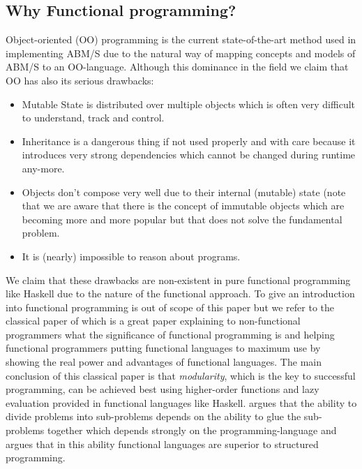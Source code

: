 \subsection{Why Functional programming?}
Object-oriented (OO) programming is the current state-of-the-art method used in implementing ABM/S due to the natural way of mapping concepts and models of ABM/S to an OO-language. Although this dominance in the field we claim that OO has also its serious drawbacks:

\begin{itemize}
\item Mutable State is distributed over multiple objects which is often very difficult to understand, track and control.
\item Inheritance is a dangerous thing if not used properly and with care because it introduces very strong dependencies which cannot be changed during runtime any-more.
\item Objects don't compose very well due to their internal (mutable) state (note that we are aware that there is the concept of immutable objects which are becoming more and more popular but that does not solve the fundamental problem.
\item It is (nearly) impossible to reason about programs.
\end{itemize}

We claim that these drawbacks are non-existent in pure functional programming like Haskell due to the nature of the functional approach. To give an introduction into functional programming is out of scope of this paper but we refer to the classical paper of \cite{hughes_why_1989} which is a great paper explaining to non-functional programmers what the significance of functional programming is and helping functional programmers putting functional languages to maximum use by showing the real power and advantages of functional languages. The main conclusion of this classical paper is that \textit{modularity}, which is the key to successful programming, can be achieved best using higher-order functions and lazy evaluation provided in functional languages like Haskell. \cite{hughes_why_1989} argues that the ability to divide problems into sub-problems depends on the ability to glue the sub-problems together which depends strongly on the programming-language and \cite{hughes_why_1989} argues that in this ability functional languages are superior to structured programming.

